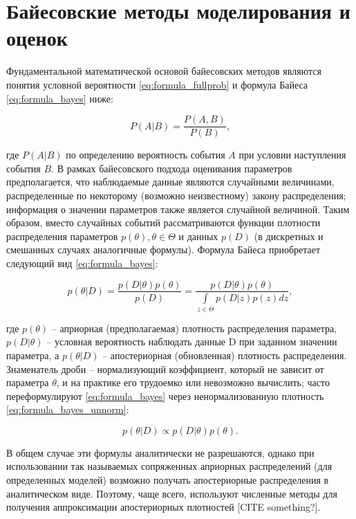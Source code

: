 \documentclass[a4paper,14pt]{extreport}
\begin{document}
\section{Байесовские методы моделирования и оценок}

Фундаментальной математической основой байесовских методов являются понятия условной вероятности \ref{eq:formula_fullprob} и формула Байеса \ref{eq:formula_bayes} ниже:

\begin{equation}
	\label{eq:formula_fullprob}
	P(A|B)=\frac{P(A,B)}{P(B)} ,
\end{equation}

\noindent
где $P(A|B)$ по определению вероятность события $A$ при условии наступления события $B$. В рамках байесовского подхода оценивания параметров предполагается, что наблюдаемые данные являются случайными величинами, распределенные по некоторому (возможно неизвестному) закону распределения; информация о значении параметров также является случайной величиной. Таким образом, вместо случайных событий рассматриваются функции плотности распределения параметров $p(\theta),  \theta \in \Theta$ и данных $p(D)$ (в дискретных и смешанных случаях аналогичные формулы). Формула Байеса приобретает следующий вид \ref{eq:formula_bayes}:

\begin{equation}
	\label{eq:formula_bayes}
	p(\theta|D) = \frac{p(D|\theta) p(\theta)}{p(D)} = \frac{p(D|\theta) p(\theta)}{\int\limits_{z\in\Theta}{p(D|z)p(z)dz}} ,
\end{equation}

\noindent
где $p(\theta)$ -- априорная (предполагаемая) плотность распределения параметра, $p(D|\theta)$ -- условная вероятность наблюдать данные D при заданном значении параметра, а $p(\theta|D)$ -- апостериорная (обновленная) плотность распределения. Знаменатель дроби -- нормализующий коэффициент, который не зависит от параметра $\theta$, и на практике его трудоемко или невозможно вычислить; часто переформулируют \ref{eq:formula_bayes} через ненормализованную плотность \ref{eq:formula_bayes_unnorm}:

\begin{equation}
	\label{eq:formula_bayes_unnorm}
	p(\theta|D) \propto p(D|\theta) p(\theta) .
\end{equation}

В общем случае эти формулы аналитически не разрешаются, однако при использовании так называемых сопряженных априорных распределений (для определенных моделей) возможно получать апостериорные распределения в аналитическом виде. Поэтому, чаще всего, используют численные методы для получения аппроксимации апостериорных плотностей [CITE something?].
\end{document}

